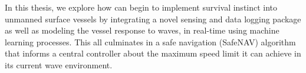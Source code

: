 In this thesis, we explore how can begin to implement survival instinct into unmanned surface vessels by integrating a novel sensing and data logging package as well as modeling the vessel response to waves, in real-time using machine learning processes.
This all culminates in a safe navigation (SafeNAV) algorithm that informs a central controller about the maximum speed limit it can achieve in its current wave environment.

